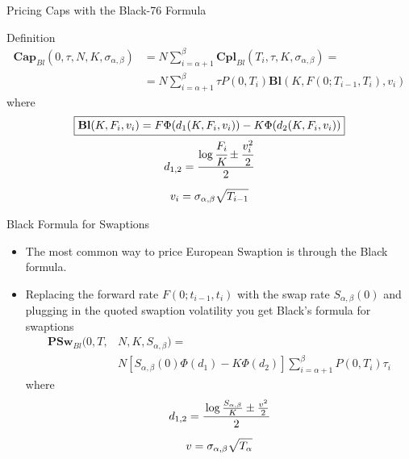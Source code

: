 \documentclass{beamer}
\begin{document}
\begin{frame}{Pricing Caps with the Black-76 Formula}
	\begin{block}{Definition}
		\begin{equation}
			\begin{aligned}
				\textbf{Cap}_{Bl}(0, \tau,N,K,\sigma_{\alpha,\beta}) &= N\sum_{i=\alpha+1}^{\beta}\textbf{Cpl}_{Bl}(T_i, \tau,K,\sigma_{\alpha,\beta}) = \\ &=N\sum_{i=\alpha+1}^{\beta}\tau P(0,T_i) \textbf{Bl}(K,F(0;T_{i-1},T_i),v_i)
			\end{aligned}
			\label{eq:cap_black}
		\end{equation}
		where
		\begin{equation*}
			\begin{gathered}
				\boxed{\textbf{Bl}(K,F_i,v_i)=F\Phi(d_1(K,F_i,v_i)) - K\Phi(d_2(K,F_i,v_i))} \\
				d_{1,2} = \frac{\log{\cfrac{F_i}{K}} \pm \cfrac{v_i^2}{2}}{2} \\[0.2cm]
				v_i = \sigma_{\alpha,\beta}\sqrt{T_{i-1}}
			\end{gathered}
		\end{equation*}
	\end{block}
\end{frame}

\begin{frame}{Black Formula for Swaptions}
	\begin{itemize}
		\item The most common way to price European Swaption is through the Black formula.
		\item Replacing the forward rate $F(0;t_{i-1},t_i)$ with the swap rate $S_{\alpha,\beta}(0)$ and plugging in the quoted swaption volatility you get Black's formula for swaptions
		\begin{equation}
			\boxed{\begin{aligned}
					\textbf{PSw}_{Bl}(0,T,&N,K,S_{\alpha,\beta})=\\
					&N\left[S_{\alpha,\beta}(0)\Phi(d_1)-K\Phi(d_2)\right]\sum_{i=\alpha+1}^\beta P(0,T_i)\tau_i
			\end{aligned}}
		\end{equation}
		where
		\begin{equation*}
			\begin{gathered}
				d_{1,2} = \cfrac{\log{\frac{S_{\alpha,\beta}}{K}} \pm \frac{v^2}{2}}{2}\\[0.2cm] 
				v = \sigma_{\alpha,\beta}\sqrt{T_\alpha}
			\end{gathered}
		\end{equation*}
	\end{itemize}
\end{frame}
\end{document}
